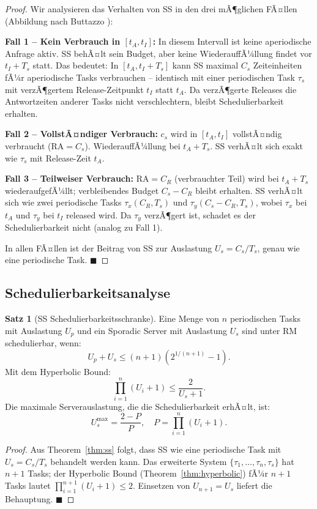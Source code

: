 ﻿\documentclass[a4paper,12pt]{report}
\theoremstyle{definition}
\newtheorem{satz}{Satz}[chapter]
\begin{document}
\begin{proof}
	Wir analysieren das Verhalten von SS in den drei mÃ¶glichen FÃ¤llen (Abbildung
	nach Buttazzo \cite{Buttazzo2011}):

	\textbf{Fall 1 -- Kein Verbrauch in $[t_A, t_I]$:}
	In diesem Intervall ist keine aperiodische Anfrage aktiv. SS behÃ¤lt sein Budget,
	aber keine WiederauffÃ¼llung findet vor $t_I + T_s$ statt. Das bedeutet: In
	$[t_A, t_I + T_s]$ kann SS maximal $C_s$ Zeiteinheiten fÃ¼r aperiodische Tasks
	verbrauchen -- identisch mit einer periodischen Task $\tau_s$ mit verzÃ¶gertem
	Release-Zeitpunkt $t_I$ statt $t_A$. Da verzÃ¶gerte Releases die Antwortzeiten
	anderer Tasks nicht verschlechtern, bleibt Schedulierbarkeit erhalten.

	\textbf{Fall 2 -- VollstÃ¤ndiger Verbrauch:}
	$c_s$ wird in $[t_A, t_I]$ vollstÃ¤ndig verbraucht ($\mathrm{RA} = C_s$).
	WiederauffÃ¼llung bei $t_A + T_s$. SS verhÃ¤lt sich exakt wie $\tau_s$ mit
	Release-Zeit $t_A$.

	\textbf{Fall 3 -- Teilweiser Verbrauch:}
	$\mathrm{RA} = C_R$ (verbrauchter Teil) wird bei $t_A + T_s$ wiederaufgefÃ¼llt;
	verbleibendes Budget $C_s - C_R$ bleibt erhalten. SS verhÃ¤lt sich wie zwei
	periodische Tasks $\tau_x(C_R, T_s)$ und $\tau_y(C_s - C_R, T_s)$, wobei
	$\tau_x$ bei $t_A$ und $\tau_y$ bei $t_I$ released wird. Da $\tau_y$ verzÃ¶gert
	ist, schadet es der Schedulierbarkeit nicht (analog zu Fall 1).

	In allen FÃ¤llen ist der Beitrag von SS zur Auslastung $U_s = C_s/T_s$, genau
	wie eine periodische Task. \hfill$\blacksquare$
\end{proof}

\subsection{Schedulierbarkeitsanalyse}

\begin{satz}[SS Schedulierbarkeitsschranke]
	\label{satz:ss_sched}
	Eine Menge von $n$ periodischen Tasks mit Auslastung $U_p$ und ein
	Sporadic Server mit Auslastung $U_s$ sind unter RM schedulierbar, wenn:
	\[
		U_p + U_s \leq (n+1)\left(2^{1/(n+1)} - 1\right).
	\]
	Mit dem Hyperbolic Bound:
	\[
		\prod_{i=1}^n (U_i + 1) \leq \frac{2}{U_s + 1}.
	\]
	Die maximale Serverauslastung, die die Schedulierbarkeit erhÃ¤lt, ist:
	\[
		U_s^{\max} = \frac{2-P}{P}, \quad P = \prod_{i=1}^n (U_i + 1).
	\]
\end{satz}

\begin{proof}
	Aus Theorem~\ref{thm:ss} folgt, dass SS wie eine periodische Task mit
	$U_s = C_s/T_s$ behandelt werden kann. Das erweiterte System
	$\{\tau_1,\ldots,\tau_n, \tau_s\}$ hat $n+1$ Tasks; der Hyperbolic Bound
	(Theorem~\ref{thm:hyperbolic}) fÃ¼r $n+1$ Tasks lautet $\prod_{i=1}^{n+1}(U_i+1) \leq 2$.
	Einsetzen von $U_{n+1} = U_s$ liefert die Behauptung. \hfill$\blacksquare$
\end{proof}
\end{document}
